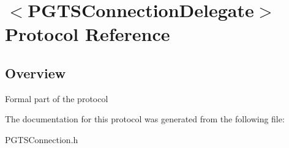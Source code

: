 \hypertarget{protocol_p_g_t_s_connection_delegate-p}{}\section{$<$P\+G\+T\+S\+Connection\+Delegate$>$ Protocol Reference}
\label{protocol_p_g_t_s_connection_delegate-p}


\subsection{Overview}
Formal part of the protocol 

The documentation for this protocol was generated from the following file\+:\begin{DoxyCompactItemize}
\item 
P\+G\+T\+S\+Connection.\+h\end{DoxyCompactItemize}
